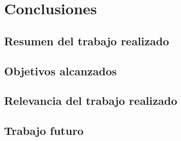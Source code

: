 \chapter{Conclusiones}
\label{sec-5}

\section{Resumen del trabajo realizado}
\label{sec-5.1}

\section{Objetivos alcanzados}
\label{sec-5.2}

\section{Relevancia del trabajo realizado}
\label{sec-5.3}

\section{Trabajo futuro}
\label{sec-5.4}

